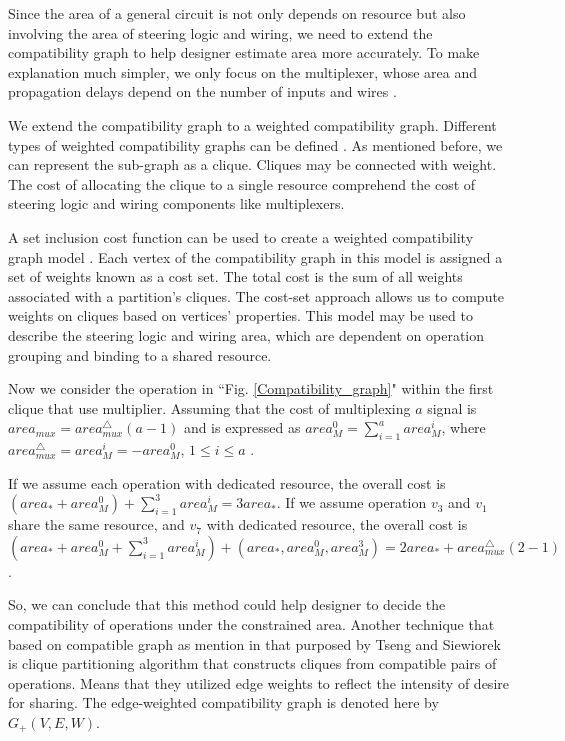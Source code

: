 Since the area of a general circuit is not only depends on resource but also involving the area of steering logic and wiring, we need to extend the compatibility graph to help designer estimate area more accurately. To make explanation much simpler, we only focus on the multiplexer, whose  area and propagation delays depend on the number of inputs and wires \cite{main}.

We extend the compatibility graph to a weighted compatibility graph.  Different types of weighted compatibility graphs can be defined \cite{main}. As mentioned before, we can represent the sub-graph as a clique. Cliques may be connected with weight. The cost of allocating the clique to a single resource comprehend the cost of steering logic and wiring components like multiplexers.

A set inclusion cost function can be used to create a weighted compatibility graph model \cite{main}. Each vertex of the compatibility graph in this model is assigned a set of weights known as a cost set. The total cost is the sum of all weights associated with a partition's cliques. The cost-set approach allows us to compute weights on cliques based on vertices' properties. This model may be used to describe the steering logic and wiring area, which are dependent on operation grouping and binding to a shared resource.

Now we consider the operation in ``Fig. \ref{Compatibility_graph}" within the first clique that use multiplier. Assuming that the cost of multiplexing $a$ signal is $area_{mux} = area_{mux}^{ \bigtriangleup}(a-1)$ and is expressed as $area_{M}^{0} = \sum_{i=1}^{a} area_{M}^{i}$, where $area_{mux}^{ \bigtriangleup}=area_{M}^{i}= -area_{M}^{0}$, $1 \leq i \leq a$ \cite{main}.

If we assume each operation with dedicated resource, the overall cost is $(area_{*} + area_{M}^{0}) + \sum_{i=1}^{3} area_{M}^{i}  = 3area_{*}$. If we assume operation $v_{3}$ and $v_{1}$ share the same resource, and $v_{7}$ with dedicated resource, the overall cost is $(area_{*} + area_{M}^{0} +\sum_{i=1}^{3} area_{M}^{i}) + (area_{*},area_{M}^{0},area_{M}^{3})  = 2area_{*} + area_{mux}^{ \bigtriangleup}(2-1)$.

So, we can conclude that this method  could help designer to decide the compatibility of operations under the constrained area. Another technique that based on compatible graph as mention in \cite{main} that purposed by Tseng and Siewiorek is clique partitioning algorithm that constructs cliques from compatible pairs of operations. Means that they utilized edge weights to reflect the intensity of desire for sharing. The edge-weighted compatibility graph is denoted here by $G_{+}(V, E, W)$.

